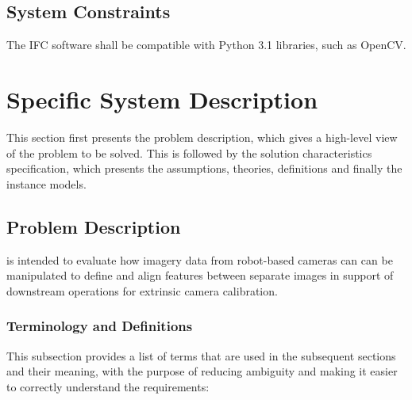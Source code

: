 \documentclass[12pt]{article}
\begin{document}
\subsection{System Constraints}
The IFC software shall be compatible with Python 3.1 libraries, such as
OpenCV.

\section{Specific System Description}
This section first presents the problem description, which gives a high-level
view of the problem to be solved.  This is followed by the solution characteristics
specification, which presents the assumptions, theories, definitions and finally
the instance models. 

\subsection{Problem Description} \label{Sec_pd}

\progname{} is intended to evaluate how imagery data from robot-based cameras can 
can be manipulated to define and align features between separate images in support 
of downstream operations for extrinsic camera calibration.

\subsubsection{Terminology and  Definitions}

This subsection provides a list of terms that are used in the subsequent
sections and their meaning, with the purpose of reducing ambiguity and making it
easier to correctly understand the requirements:
\end{document}
